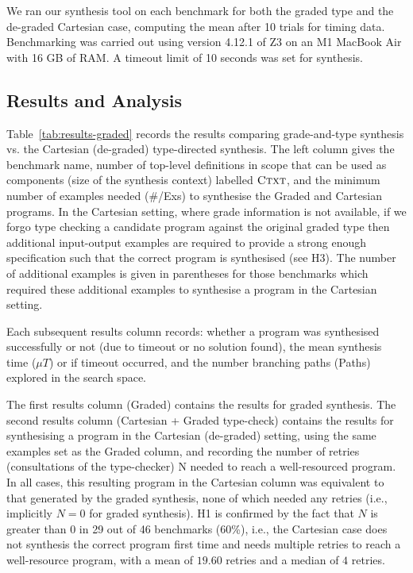 We ran our synthesis tool on each benchmark for both the graded
type and the de-graded Cartesian case, computing
the mean after 10 trials for timing data. Benchmarking was carried out using
version 4.12.1 of Z3 on an M1 MacBook Air with 16 GB of RAM.
A timeout limit of 10 seconds was set for synthesis.

\subsection{Results and Analysis}


Table~\ref{tab:results-graded} records the results comparing grade-and-type
synthesis vs. the Cartesian (de-graded) type-directed synthesis.  The
left column gives the benchmark name, number of top-level definitions
in scope that can be used as components (size of the synthesis
context) labelled $\textsc{Ctxt}$, and the minimum number of examples
needed (\#/Exs) to synthesise the Graded and Cartesian programs. In
the Cartesian setting, where grade information is not available, if we
forgo type checking a candidate program against the original graded
type then additional input-output examples are required to provide a
strong enough specification such that the correct program is
synthesised (see H3). The number of additional examples is given in
parentheses for those benchmarks which required these additional
examples to synthesise a program in the Cartesian setting.

Each subsequent results column records: whether a program was synthesised
successfully \success{} or not \fail{} (due to timeout or no solution found),
the mean synthesis time ($\mu{}T$) or if timeout occurred, and
the number branching paths (Paths) explored in the search space.

The first results column (Graded) contains the results for graded synthesis. The
second results column (Cartesian + Graded type-check) contains the results for
synthesising a program in the Cartesian (de-graded) setting, using the same
examples set as the Graded column, and recording the number of retries
(consultations of the type-checker) \textsc{N} needed to reach a well-resourced
program. In all cases, this resulting program in the Cartesian column was
equivalent to that generated by the graded synthesis, none of which needed any
retries (i.e., implicitly $N = 0$ for graded synthesis). H1 is confirmed by the
fact that $N$ is greater than $0$ in 29 out of 46 benchmarks (60\%), i.e., the
Cartesian case does not synthesis the correct program first time and needs
multiple retries to reach a well-resource program, with a mean of $19.60$
retries and a median of $4$ retries.

